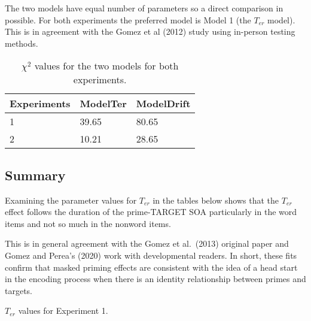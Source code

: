 \documentclass[
  english,
  man,floatsintext]{apa6}
\begin{document}
\begin{appendix}
The two models have equal number of parameters so a direct comparison in
possible. For both experiments the preferred model is Model 1 (the
\(T_{er}\) model). This is in agreement with the Gomez et al (2012)
study using in-person testing methods.

\begin{table}[tbp]

\begin{center}
\begin{threeparttable}

\caption{\label{tab:model_parameters_table}$\chi^2$ values for the two models for both experiments.}

\begin{tabular}{lll}
\toprule
Experiments & \multicolumn{1}{c}{ModelTer} & \multicolumn{1}{c}{ModelDrift}\\
\midrule
1 & 39.65 & 80.65\\
2 & 10.21 & 28.65\\
\bottomrule
\end{tabular}

\end{threeparttable}
\end{center}

\end{table}

\hypertarget{summary}{%
\subsection{Summary}\label{summary}}

Examining the parameter values for \(T_{er}\) in the tables below shows
that the \(T_{er}\) effect follows the duration of the prime-TARGET SOA
particularly in the word items and not so much in the nonword items.

This is in general agreement with the Gomez et al.~(2013) original paper
and Gomez and Perea's (2020) work with developmental readers. In short,
these fits confirm that masked priming effects are consistent with the
idea of a head start in the encoding process when there is an identity
relationship between primes and targets.

\begin{table}[tbp]

\begin{center}
\begin{threeparttable}

\caption{\label{tab:appendix_table_2}$T_{er}$ values for Experiment 1.}


\end{threeparttable}
\end{center}
\end{table}
\end{appendix}
\end{document}
